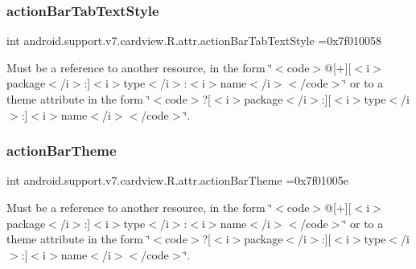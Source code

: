 \subsubsection{\texorpdfstring{action\+Bar\+Tab\+Text\+Style}{actionBarTabTextStyle}}
{\footnotesize\ttfamily int android.\+support.\+v7.\+cardview.\+R.\+attr.\+action\+Bar\+Tab\+Text\+Style =0x7f010058\hspace{0.3cm}{\ttfamily [static]}}

Must be a reference to another resource, in the form \char`\"{}$<$code$>$@\mbox{[}+\mbox{]}\mbox{[}$<$i$>$package$<$/i$>$\+:\mbox{]}$<$i$>$type$<$/i$>$\+:$<$i$>$name$<$/i$>$$<$/code$>$\char`\"{} or to a theme attribute in the form \char`\"{}$<$code$>$?\mbox{[}$<$i$>$package$<$/i$>$\+:\mbox{]}\mbox{[}$<$i$>$type$<$/i$>$\+:\mbox{]}$<$i$>$name$<$/i$>$$<$/code$>$\char`\"{}. \mbox{\label{classandroid_1_1support_1_1v7_1_1cardview_1_1R_1_1attr_a99964711ceb2ce863f537ae400002383}} 
\subsubsection{\texorpdfstring{action\+Bar\+Theme}{actionBarTheme}}
{\footnotesize\ttfamily int android.\+support.\+v7.\+cardview.\+R.\+attr.\+action\+Bar\+Theme =0x7f01005e\hspace{0.3cm}{\ttfamily [static]}}

Must be a reference to another resource, in the form \char`\"{}$<$code$>$@\mbox{[}+\mbox{]}\mbox{[}$<$i$>$package$<$/i$>$\+:\mbox{]}$<$i$>$type$<$/i$>$\+:$<$i$>$name$<$/i$>$$<$/code$>$\char`\"{} or to a theme attribute in the form \char`\"{}$<$code$>$?\mbox{[}$<$i$>$package$<$/i$>$\+:\mbox{]}\mbox{[}$<$i$>$type$<$/i$>$\+:\mbox{]}$<$i$>$name$<$/i$>$$<$/code$>$\char`\"{}. \mbox{\label{classandroid_1_1support_1_1v7_1_1cardview_1_1R_1_1attr_a1785c41d63b19609ccdcf0b1806a98a8}} 
